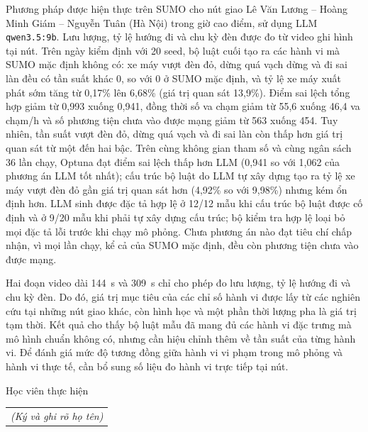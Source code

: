 \documentclass[../main.tex]{subfiles}
\begin{document}
Phương pháp được hiện thực trên SUMO cho nút giao Lê Văn Lương -- Hoàng Minh Giám -- Nguyễn Tuân (Hà Nội) trong giờ cao điểm, sử dụng LLM \texttt{qwen3.5:9b}. Lưu lượng, tỷ lệ hướng đi và chu kỳ đèn được đo từ video ghi hình tại nút. Trên ngày kiểm định với 20 seed, bộ luật cuối tạo ra các hành vi mà SUMO mặc định không có: xe máy vượt đèn đỏ, dừng quá vạch dừng và đi sai làn đều có tần suất khác 0, so với 0 ở SUMO mặc định, và tỷ lệ xe máy xuất phát sớm tăng từ 0,17\% lên 6,68\% (giá trị quan sát 13,9\%). Điểm sai lệch tổng hợp giảm từ 0,993 xuống 0,941, đồng thời số va chạm giảm từ 55,6 xuống 46,4 va chạm/h và số phương tiện chưa vào được mạng giảm từ 563 xuống 454. Tuy nhiên, tần suất vượt đèn đỏ, dừng quá vạch và đi sai làn còn thấp hơn giá trị quan sát từ một đến hai bậc. Trên cùng không gian tham số và cùng ngân sách 36 lần chạy, Optuna đạt điểm sai lệch thấp hơn LLM (0,941 so với 1,062 của phương án LLM tốt nhất); cấu trúc bộ luật do LLM tự xây dựng tạo ra tỷ lệ xe máy vượt đèn đỏ gần giá trị quan sát hơn (4,92\% so với 9,98\%) nhưng kém ổn định hơn. LLM sinh được đặc tả hợp lệ ở 12/12 mẫu khi cấu trúc bộ luật được cố định và ở 9/20 mẫu khi phải tự xây dựng cấu trúc; bộ kiểm tra hợp lệ loại bỏ mọi đặc tả lỗi trước khi chạy mô phỏng. Chưa phương án nào đạt tiêu chí chấp nhận, vì mọi lần chạy, kể cả của SUMO mặc định, đều còn phương tiện chưa vào được mạng.

Hai đoạn video dài 144~s và 309~s chỉ cho phép đo lưu lượng, tỷ lệ hướng đi và chu kỳ đèn. Do đó, giá trị mục tiêu của các chỉ số hành vi được lấy từ các nghiên cứu tại những nút giao khác, còn hình học và một phần thời lượng pha là giá trị tạm thời. Kết quả cho thấy bộ luật mẫu đã mang đủ các hành vi đặc trưng mà mô hình chuẩn không có, nhưng cần hiệu chỉnh thêm về tần suất của từng hành vi. Để đánh giá mức độ tương đồng giữa hành vi vi phạm trong mô phỏng và hành vi thực tế, cần bổ sung số liệu đo hành vi trực tiếp tại nút.

\begin{flushright}
Học viên thực hiện\\
\begin{tabular}{@{}c@{}}
\textit{(Ký và ghi rõ họ tên)}
\end{tabular}
\end{flushright}
\end{document}
